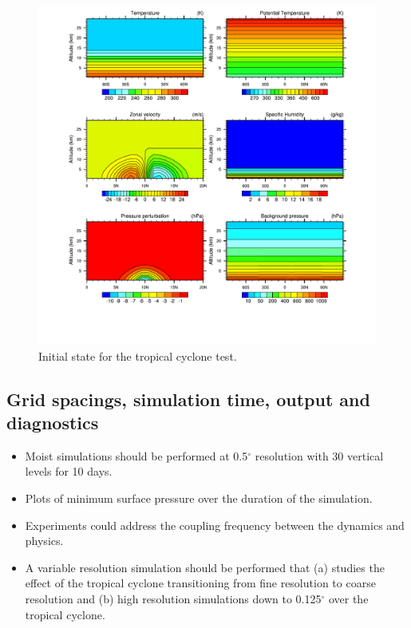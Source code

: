 \documentclass[times,doublespace]{fldauth}
\begin{document}
{\begin{figure}[tb]
\center\includegraphics[width=\linewidth]{plot_tropicalcyclone_init.pdf}
  \caption{Initial state for the tropical cyclone test.}\label{fig:tropicalcyclone_init}
\end{figure} 

\subsection{Grid spacings, simulation time, output and diagnostics}

\begin{itemize}
\item Moist simulations should be performed at 0.5$^\circ$ resolution with 30 vertical levels for 10 days.
\item Plots of minimum surface pressure over the duration of the simulation.
\item Experiments could address the coupling frequency between the dynamics and physics.
\item A variable resolution simulation should be performed that (a) studies the effect of the tropical cyclone transitioning from fine resolution to coarse resolution and (b) high resolution simulations down to 0.125$^\circ$ over the tropical cyclone.
\end{itemize}

}
\end{document}
